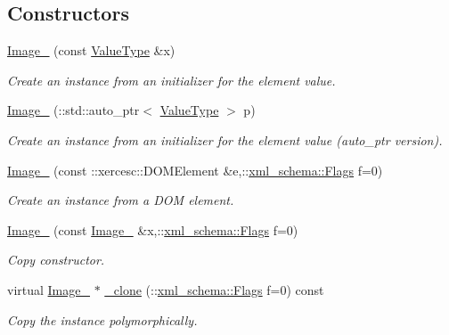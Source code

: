 \subsection*{Constructors}
\begin{DoxyCompactItemize}
\item 
\hyperlink{classopenstack_1_1xml_1_1Image___a9f57dba725d3875a4977ae74224014b0}{Image\_\-} (const \hyperlink{classopenstack_1_1xml_1_1Image}{ValueType} \&x)
\begin{DoxyCompactList}\small\item\em Create an instance from an initializer for the element value. \item\end{DoxyCompactList}\item 
\hyperlink{classopenstack_1_1xml_1_1Image___a75deb12a862ed8022c2c6d9c8790a905}{Image\_\-} (::std::auto\_\-ptr$<$ \hyperlink{classopenstack_1_1xml_1_1Image}{ValueType} $>$ p)
\begin{DoxyCompactList}\small\item\em Create an instance from an initializer for the element value (auto\_\-ptr version). \item\end{DoxyCompactList}\item 
\hyperlink{classopenstack_1_1xml_1_1Image___ad52729b294caf6f384ed3b138ca9769d}{Image\_\-} (const ::xercesc::DOMElement \&e,::\hyperlink{namespacexml__schema_affb4c227cbd9aa7453dd1dc5a1401943}{xml\_\-schema::Flags} f=0)
\begin{DoxyCompactList}\small\item\em Create an instance from a DOM element. \item\end{DoxyCompactList}\item 
\hyperlink{classopenstack_1_1xml_1_1Image___ae0b57eb76baaca6de07c340fddd3d428}{Image\_\-} (const \hyperlink{classopenstack_1_1xml_1_1Image__}{Image\_\-} \&x,::\hyperlink{namespacexml__schema_affb4c227cbd9aa7453dd1dc5a1401943}{xml\_\-schema::Flags} f=0)
\begin{DoxyCompactList}\small\item\em Copy constructor. \item\end{DoxyCompactList}\item 
virtual \hyperlink{classopenstack_1_1xml_1_1Image__}{Image\_\-} $\ast$ \hyperlink{classopenstack_1_1xml_1_1Image___a1c825813c68e95038868d34faeec8609}{\_\-clone} (::\hyperlink{namespacexml__schema_affb4c227cbd9aa7453dd1dc5a1401943}{xml\_\-schema::Flags} f=0) const 
\begin{DoxyCompactList}\small\item\em Copy the instance polymorphically. \item\end{DoxyCompactList}\end{DoxyCompactItemize}
